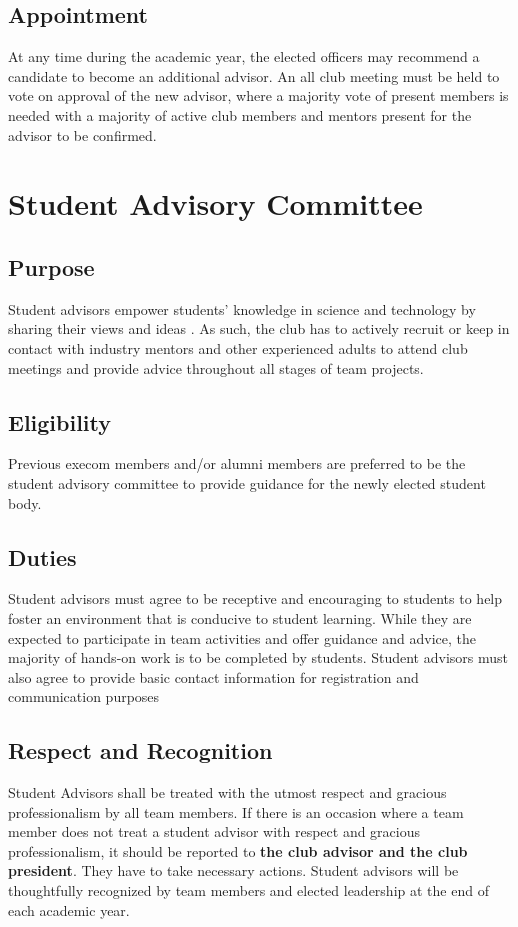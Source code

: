 \subsection{Appointment}
At any time during the academic year, the elected officers may recommend a candidate to become an additional advisor. An all club meeting must be held to vote on approval of the new advisor, where a majority vote of present members is needed with a majority of active club members and mentors present for the advisor to be confirmed.

\section{Student Advisory Committee}
\subsection{Purpose}
Student advisors empower students' knowledge in science and technology by sharing their views and ideas . As such, the club has to actively recruit or keep in contact with industry mentors and other experienced adults to attend club meetings and provide advice throughout all stages of team projects.

\subsection{Eligibility}
Previous execom members and/or alumni members are preferred to be the student advisory committee to provide guidance for the newly elected student body.

\subsection{Duties}
Student advisors must agree to be receptive and encouraging to students to help foster an environment that is conducive to student learning. While they are expected to participate in team activities and offer guidance and advice, the majority of hands-on work is to be completed by students. Student advisors must also agree to provide basic contact information for registration and communication purposes 

\subsection{Respect and Recognition}
Student Advisors shall be treated with the utmost respect and gracious professionalism by all team members. If there is an occasion where a team member does not treat a student advisor with respect and gracious professionalism, it should be reported to \textbf{the club advisor and the club president}. They have to take necessary actions. Student advisors will be thoughtfully recognized by team members and elected leadership at the end of each academic year.

